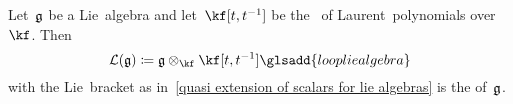 \begin{example}
	Let~$\mathfrak{g}$ be a Lie~algebra and let~$\kf[t, t^{-1}]$ be the~\algebra{$\kf$} of Laurent~polynomials over~$\kf$.
	Then
	\[
		\looplie(\glie)
		\defined
		\glie \tensor_{\kf} \kf[t, t^{-1}]
		\glsadd{loop lie algebra}
	\]
	with the Lie~bracket as in~\cref{quasi extension of scalars for lie algebras} is the  of~$\mathfrak{g}$.
\end{example}


%   
